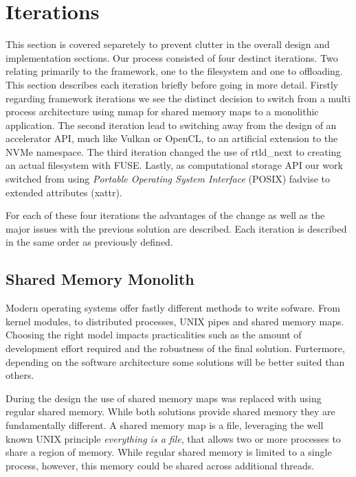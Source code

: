 
\section{Iterations}

This section is covered separetely to prevent clutter in the overall design and
implementation sections. Our process consisted of four destinct iterations.
Two relating primarily to the framework, one to the filesystem and one to
offloading. This section describes each iteration briefly before going in more
detail. Firstly regarding framework iterations we see the distinct decision
to switch from a multi process architecture using mmap for shared memory maps to
a monolithic application. The second iteration lead to switching away from the
design of an accelerator API, much like Vulkan \cite{vulkan} or OpenCL, to an
artificial extension to the NVMe namespace. The third iteration changed the use
of rtld\_next \cite{rtldnext} to creating an actual filesystem with FUSE.
Lastly, as computational storage API our work switched from using
\textit{Portable Operating System Interface} (POSIX) fadvise \cite{fadvise} to
extended attributes (xattr).

For each of these four iterations the advantages of the change as well as the
major issues with the previous solution are described. Each iteration is
described in the same order as previously defined.

\subsection{Shared Memory Monolith}

Modern operating systems offer fastly different methods to write sofware. From
kernel modules, to distributed processes, UNIX pipes and shared memory maps.
Choosing the right model impacts practicalities such as the amount of
development effort required and the robustness of the final solution. 
Furtermore, depending on the software architecture some solutions will be better
suited than others.

During the design the use of shared memory maps was replaced with using regular
shared memory. While both solutions provide shared memory they are fundamentally
different. A shared memory map is a file, leveraging the well known UNIX
principle \textit{everything is a file}, that allows two or more processes to
share a region of memory. While regular shared memory is limited to a single
process, however, this memory could be shared across additional threads.

